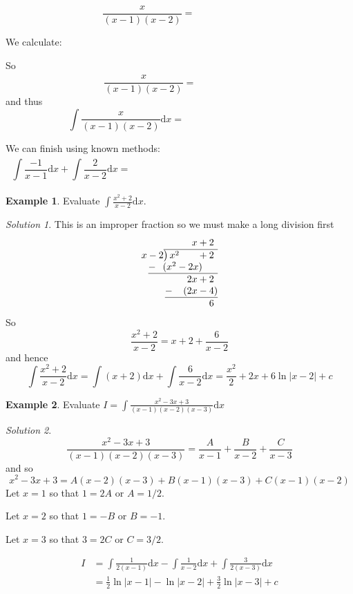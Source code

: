 \documentclass[
  english,
  11pt,
  oneside]{book}
\newcommand{\slide}{}
\theoremstyle{definition}
\theoremstyle{definition}
\newtheorem{example}{Example}[chapter]
\theoremstyle{definition}
\theoremstyle{definition}
\theoremstyle{remark}
\newtheorem*{solution}{Solution}
\begin{document}
\begin{slidesonly}

\[\frac{x}{(x-1)(x-2)} = \phantom{\frac A{x-1}+\frac B{x-2}.}\]
\slide

We calculate:

\vfill

So
\[\frac{x}{(x-1)(x-2)} = \phantom{\frac {-1}{x-1}+\frac 2{x-2}}\]
and thus
\[\int\frac{x}{(x-1)(x-2)}\mathrm{d}x = \phantom{\int\frac {-1}{x-1}\mathrm{d}x+\int\frac 2{x-2}\mathrm{d}x}\]
\slide
We can finish using known methods:
\[\int\frac {-1}{x-1}\mathrm{d}x+\int\frac 2{x-2}\mathrm{d}x = \phantom{-\ln|x-1|+2\ln|x-2|+c = \ln\left|\frac{(x-2)^2}{x-1}\right|+c.}\]
\slide

\end{slidesonly}

\begin{example}
Evaluate \(\displaystyle\int\frac{x^2+2}{x-2}\mathrm{d}x\).
\end{example}

\begin{solution}
This is an improper fraction so we must make a long division first
\[\begin{array}{r}
x+2\phantom{)}   \\
x-2{\overline{\smash{\big)}\,x^2\phantom{+2x}+2\phantom{)}}}\\
\underline{-~\phantom{(}(x^2-2x)\phantom{-b)}}\\
\phantom{0+}2x+2\phantom{)}\\ 
\underline{-~\phantom{()}(2x-4)}\\ 
\phantom{0+}6\phantom{)}
\end{array}\]
So
\[\frac{x^2+2}{x-2} = x+2+\frac6{x-2}\]
and hence
\[\int\frac{x^2+2}{x-2}\mathrm{d}x = \int (x+2)\mathrm{d}x+\int\frac6{x-2}\mathrm{d}x = \frac{x^2}{2}+2x+6\ln|x-2|+c\]
\end{solution}

\slide

\begin{example}
Evaluate \(I = \displaystyle\int\frac{x^2-3x+3}{(x-1)(x-2)(x-3)} \mathrm{d}x\)
\end{example}

\begin{solution}
\[\frac{x^2-3x+3}{(x-1)(x-2)(x-3)} = \frac A{x-1}+\frac B{x-2}+\frac C{x-3}\]
and so
\[x^2-3x+3 = A(x-2)(x-3) + B(x-1)(x-3) + C(x-1)(x-2)\]
Let \(x=1\) so that \(1=2A\) or \(A=1/2\).

Let \(x=2\) so that \(1=-B\) or \(B=-1\).

Let \(x=3\) so that \(3=2C\) or \(C=3/2\).

\begin{align*}
I&= \int\frac 1{2(x-1)}\mathrm{d}x-\int\frac 1{x-2}\mathrm{d}x+\int\frac 3{2(x-3)}\mathrm{d}x\\
&=\frac 12\ln|x-1| -\ln|x-2| + \frac 32\ln|x-3|+c
\end{align*}
\end{solution}
\end{document}
